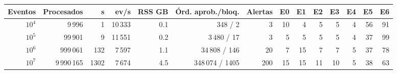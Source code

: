 \setlength{\tabcolsep}{4pt}
\begin{tabular}{@{}rrrrrrrrrrrrrr@{}}\toprule
Eventos & Procesados & s & ev/s & RSS GB & Órd. aprob./bloq. & Alertas & E0 & E1 & E2 & E3 & E4 & E5 & E6 \\\midrule
$10^4$ & 9\,996 & 1 & 10\,333 & 0.1 & 348 / 2 & 3 & 10 & 4 & 5 & 5 & 4 & 56 & 91 \\
$10^5$ & 99\,901 & 9 & 11\,551 & 0.2 & 3\,480 / 17 & 3 & 5 & 5 & 5 & 5 & 4 & 37 & 99 \\
$10^6$ & 999\,061 & 132 & 7\,597 & 1.1 & 34\,808 / 146 & 20 & 7 & 15 & 7 & 7 & 5 & 37 & 78 \\
$10^7$ & 9\,990\,165 & 1302 & 7\,674 & 4.5 & 348\,074 / 1405 & 200 & 15 & 15 & 11 & 10 & 5 & 38 & 63 \\
\bottomrule\end{tabular}